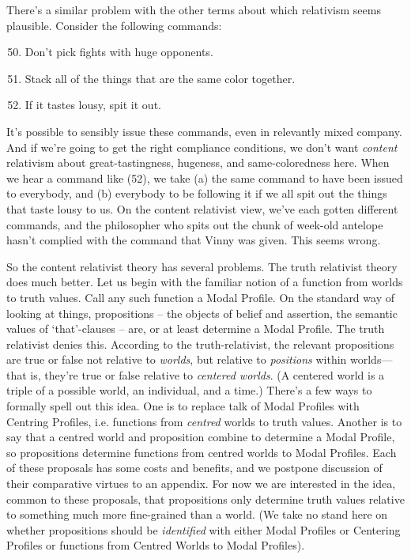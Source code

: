 There's a similar problem with the other terms about which relativism seems plausible. Consider the following commands:
 
\begin{enumerate}
\setcounter{enumi}{49} 
\item Don't pick fights with huge opponents.
\item Stack all of the things that are the same color together.
\item If it tastes lousy, spit it out.
\end{enumerate}

\noindent It's possible to sensibly issue these commands, even in relevantly mixed company. And if we're going to get the right compliance conditions, we don't want \textit{content }relativism about great-tastingness, hugeness, and same-coloredness here. When we hear a command like (52), we take (a) the same command to have been issued to everybody, and (b) everybody to be following it if we all spit out the things that taste lousy to us. On the content relativist view, we've each gotten different commands, and the philosopher who spits out the chunk of week-old antelope hasn't complied with the command that Vinny was given. This seems wrong.
 
So the content relativist theory has several problems. The truth relativist theory does much better. Let us begin with the familiar notion of a function from worlds to truth values. Call any such function a Modal Profile. On the standard way of looking at things, propositions -- the objects of belief and assertion, the semantic values of `that'-clauses -- are, or at least determine a Modal Profile. The truth relativist denies this. According to the truth-relativist, the relevant propositions are true or false not relative to \textit{worlds}, but relative to \textit{positions} within worlds---that is, they're true or false relative to \textit{centered worlds}. (A centered world is a triple of a possible world, an individual, and a time.) There's a few ways to formally spell out this idea. One is to replace talk of Modal Profiles with Centring Profiles, i.e. functions from \textit{centred} worlds to truth values. Another is to say that a centred world and proposition combine to determine a Modal Profile, so propositions determine functions from centred worlds to Modal Profiles. Each of these proposals has some costs and benefits, and we postpone discussion of their comparative virtues to an appendix. For now we are interested in the idea, common to these proposals, that propositions only determine truth values relative to something much more fine-grained than a world. (We take no stand here on whether propositions should be \textit{identified} with either Modal Profiles or Centering Profiles or functions from Centred Worlds to Modal Profiles).
 
